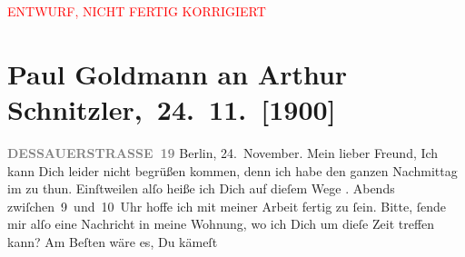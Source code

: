 
\begin{center}
            \textcolor{red}{ENTWURF, NICHT FERTIG KORRIGIERT}
                      \end{center}
            
         
         \renewcommand{\erwaehntePersonen}{Personen: Moritz Coschell, Marie Glümer, Alfred Kerr, Paul Martin Marton}
         \renewcommand{\erwaehnteOrte}{Orte: Berlin, Dessauer Straße, Hotel Kaiserhof, Reichstag}
         \renewcommand{\erwaehnteWerke}{}
               \section[ Paul Goldmann an Arthur Schnitzler, 24. 11. {[}1900{]}]{ Paul Goldmann an Arthur Schnitzler, 24. 11. {[}1900{]}}\nopagebreak{}\rehead{ }\begin{ledgroupsized}[t]{13cm}\normalsize\beginnumbering \toendnotes[C]{\smallbreak\pagebreak[2]} 
\toendnotes[C]{\smallbreak}\pstart{}{\pb}\textcolor{gray}{\textbf{DESSAUERSTRASSE 19}}\pend{}{\bigskip}\pstart
           Berlin, 24. November.\pend
           \pstart\center{}Mein lieber Freund,\pend\pstart
           Ich kann Dich leider nicht begrüßen kommen, denn ich habe den ganzen Nachmittag im
                  \label{K_L02940-2v}\label{K_L02940-2h} zu thun. Einſtweilen alſo heiße ich Dich auf dieſem Wege \label{K_L02940-1v}\label{K_L02940-1h}. Abends
                  zwiſchen 9 und 10 Uhr hoffe ich mit meiner Arbeit fertig zu ſein. Bitte,
               ſende mir alſo eine Nachricht in meine Wohnung, wo ich Dich um dieſe Zeit treffen {\pb}kann? Am Beſten wäre es, Du kämeſt

\end{ledgroupsized}
